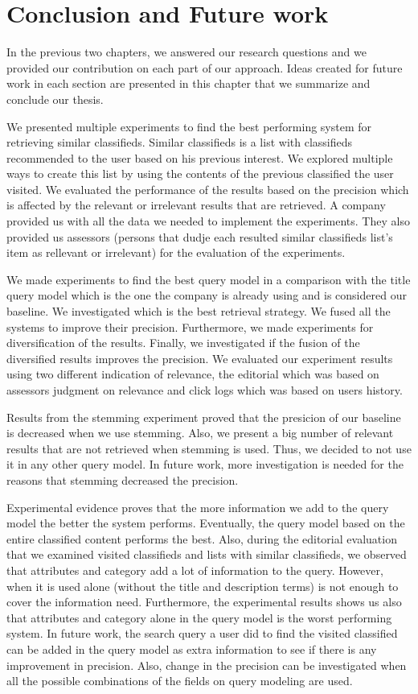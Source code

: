 \chapter{Conclusion and Future work}

In the previous two chapters, we answered our research questions and we provided our contribution on each part of our approach. Ideas created for future work in each section are presented in this chapter that we summarize and conclude our thesis.

We presented multiple experiments to find the best performing system for retrieving similar classifieds. Similar classifieds is a list with classifieds recommended to the user based on his previous interest. We explored multiple ways to create this list by using the contents of the previous classified the user visited. We evaluated the performance of the results based on the precision which is affected by the relevant or irrelevant results that are retrieved. A company provided us with all the data we needed to implement the experiments. They also provided us assessors (persons that dudje each resulted similar classifieds list's item as rellevant or irrelevant) for the evaluation of the experiments.


We made experiments to find the best query model in a comparison with the title query model which is the one the company is already using and is considered our baseline. We investigated which is the best retrieval strategy. We fused all the systems to improve their precision. Furthermore, we made experiments for diversification of the results. Finally, we investigated if the fusion of the diversified results improves the precision. We evaluated our experiment results using two different indication of relevance, the editorial which was based on assessors judgment on relevance and click logs which was based on users history.


Results from the stemming experiment proved that the presicion of our baseline is decreased when we use stemming. Also, we present a big number of relevant results that are not retrieved when stemming is used. Thus, we decided to not use it in any other query model. In future work, more investigation is needed for the reasons that stemming decreased the precision.


Experimental evidence proves that the more information we add to the query model the better the system performs. Eventually, the query model based on the entire classified content performs the best. Also, during the editorial evaluation that we examined visited classifieds and lists with similar classifieds, we observed that attributes and category add a lot of information to the query. However, when it is used alone (without the title and description terms) is not enough to cover the information need. Furthermore, the experimental results shows us also that attributes and category alone in the query model is the worst performing system. In future work, the search query a user did to find the visited classified can be added in the query model as extra information to see if there is any improvement in precision. Also, change in the precision can be investigated when all the possible combinations of the fields on query modeling are used.



